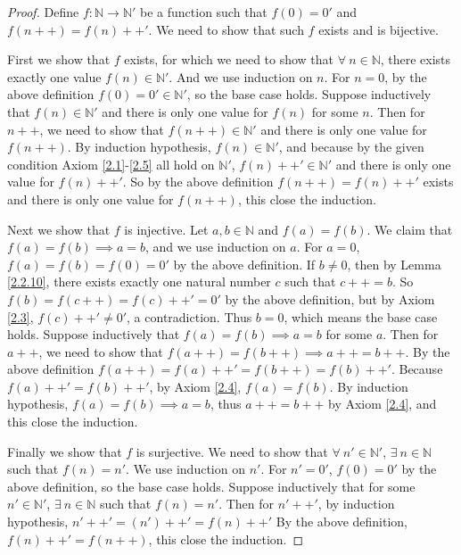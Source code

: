 \begin{proof}
Define \(f: \mathds{N} \to \mathds{N}'\) be a function such that \(f(0) = 0'\) and \(f(n++) = f(n)++'\).
We need to show that such \(f\) exists and is bijective.

First we show that \(f\) exists, for which we need to show that \(\forall\ n \in \mathds{N}\), there exists exactly one value \(f(n) \in \mathds{N}'\).
And we use induction on \(n\).
For \(n = 0\), by the above definition \(f(0) = 0' \in \mathds{N}'\), so the base case holds.
Suppose inductively that \(f(n) \in \mathds{N}'\) and there is only one value for \(f(n)\) for some \(n\).
Then for \(n++\), we need to show that \(f(n++) \in \mathds{N}'\) and there is only one value for \(f(n++)\).
By induction hypothesis, \(f(n) \in \mathds{N}'\), and because by the given condition Axiom \ref{2.1}-\ref{2.5} all hold on \(\mathds{N}'\), \(f(n)++' \in \mathds{N}'\) and there is only one value for \(f(n)++'\).
So by the above definition \(f(n++) = f(n)++'\) exists and there is only one value for \(f(n++)\), this close the induction.

Next we show that \(f\) is injective.
Let \(a, b \in \mathds{N}\) and \(f(a) = f(b)\).
We claim that \(f(a) = f(b) \implies a = b\), and we use induction on \(a\).
For \(a = 0\), \(f(a) = f(b) = f(0) = 0'\) by the above definition.
If \(b \neq 0\), then by Lemma \ref{2.2.10}, there exists exactly one natural number \(c\) such that \(c++ = b\).
So \(f(b) = f(c++) = f(c)++' = 0'\) by the above definition, but by Axiom \ref{2.3}, \(f(c)++' \neq 0'\), a contradiction.
Thus \(b = 0\), which means the base case holds.
Suppose inductively that \(f(a) = f(b) \implies a = b\) for some \(a\).
Then for \(a++\), we need to show that \(f(a++) = f(b++) \implies a++ = b++\).
By the above definition \(f(a++) = f(a)++' = f(b++) = f(b)++'\).
Because \(f(a)++' = f(b)++'\), by Axiom \ref{2.4}, \(f(a) = f(b)\).
By induction hypothesis, \(f(a) = f(b) \implies a = b\), thus \(a++ = b++\) by Axiom \ref{2.4}, and this close the induction.

Finally we show that \(f\) is surjective.
We need to show that \(\forall\ n' \in \mathds{N}'\), \(\exists\ n \in \mathds{N}\) such that \(f(n) = n'\).
We use induction on \(n'\).
For \(n' = 0'\), \(f(0) = 0'\) by the above definition, so the base case holds.
Suppose inductively that for some \(n' \in \mathds{N}'\), \(\exists\ n \in \mathds{N}\) such that \(f(n) = n'\).
Then for \(n'++'\), by induction hypothesis, \(n'++' = (n')++' = f(n)++'\)
By the above definition, \(f(n)++' = f(n++)\), this close the induction.
\end{proof}

